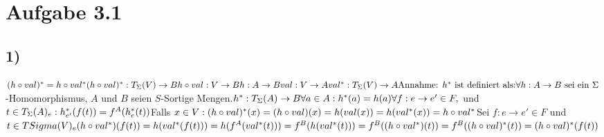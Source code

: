 \section*{Aufgabe 3.1}
\subsection*{1)}
$(h \circ val)^* = h \circ val^*\\
\\
(h \circ val)^* : T_{\Sigma}(V) \rightarrow B\\
h \circ val : V \rightarrow B\\
h : A \rightarrow B\\
val : V \rightarrow A\\
val^* : T_\Sigma(V) \rightarrow A\\
\\
\text{Annahme: } h^* \text{ ist definiert als:}\\
\forall h : A \rightarrow B \text{ sei ein } \Sigma$-Homomorphismus, $A$ und $B$ seien $S$-Sortige Mengen.$\\
h^* : T_\Sigma(A) \rightarrow B\\
\forall a\in A: h^*(a) = h(a)\\
\forall f: e \rightarrow e' \in F, $ und $ t \in T_\Sigma(A)_e: h_{e'}^*(f(t)) = f^A(h_e^*(t))\\
\\
$Falls $ x\in V:\\
(h\circ val)^*(x) = (h\circ val)(x) = h(val(x)) = h(val^*(x)) = h\circ val^* \\
$Sei $f:e\rightarrow e' \in F$ und $t\in T\\Sigma(V)_e\\
(h\circ val^*)(f(t))=h(val^*(f(t)))=h(f^A(val^*(t)))=f^B(h(val^*(t)))=f^B((h\circ val^*)(t)) = f^B((h\circ val)^*(t)) =(h\circ val)^*(f(t))$
